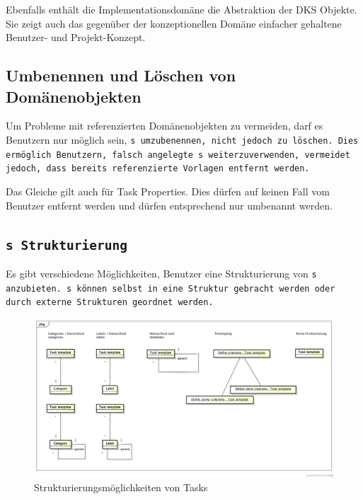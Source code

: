 			Ebenfalls enthält die Implementationsdomäne die Abstraktion der DKS Objekte.
			Sie zeigt auch das gegenüber der konzeptionellen Domäne einfacher gehaltene Benutzer- und Projekt-Konzept.
			
			
		\subsection{Umbenennen und Löschen von Domänenobjekten}
			Um Probleme mit referenzierten Domänenobjekten zu vermeiden,
			darf es Benutzern nur möglich sein, \tt s umzubenennen,
			nicht jedoch zu löschen.
			Dies ermöglich Benutzern, 
			falsch angelegte \tt s weiterzuverwenden, vermeidet jedoch, 
			dass bereits referenzierte Vorlagen entfernt werden.
			
			Das Gleiche gilt auch für Task Properties.
			Dies dürfen auf keinen Fall vom Benutzer entfernt werden 
			und dürfen entsprechend nur umbenannt werden.
			
		
		\subsection{\tt s Strukturierung}
			Es gibt verschiedene Möglichkeiten, 
			Benutzer eine Strukturierung von \tt s anzubieten.
			\tt s können selbst in eine Struktur gebracht werden
			oder durch externe Strukturen geordnet werden.
		
			\begin{figure}[H]
				\includegraphics[width=\textwidth]{architecture/media/img/taskTemplateStructure.png}
				\centering
				\caption{Strukturierungsmöglichkeiten von Tasks}
				\label{fig:taskTemplateStructure}
			\end{figure}
			
